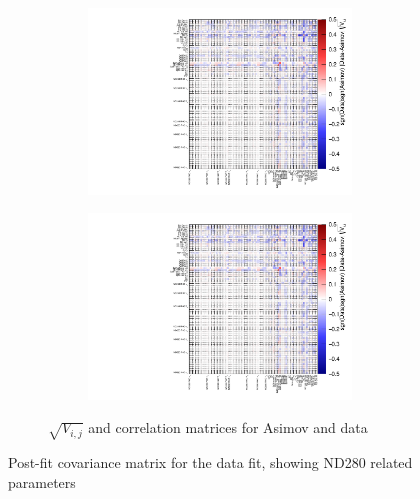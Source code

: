 \begin{figure}[h]
\begin{subfigure}[t]{\textwidth}
	\begin{subfigure}[t]{0.49\textwidth}
		\includegraphics[width=\textwidth, trim={0mm 0mm 0mm 0mm}, clip,page=1]{figures/mach3/data/corr/data_asimov_corr_ratio}
	\end{subfigure}
	\begin{subfigure}[t]{0.49\textwidth}
		\includegraphics[width=\textwidth, trim={0mm 0mm 0mm 0mm}, clip,page=2]{figures/mach3/data/corr/data_asimov_corr_ratio}
	\end{subfigure}
	\caption{$\sqrt{V_{i,j}}$ and correlation matrices for Asimov and data}
\end{subfigure}
\caption{Post-fit covariance matrix for the data fit, showing ND280 related parameters}
\label{fig:postfit_corr_nd280}
\end{figure}

